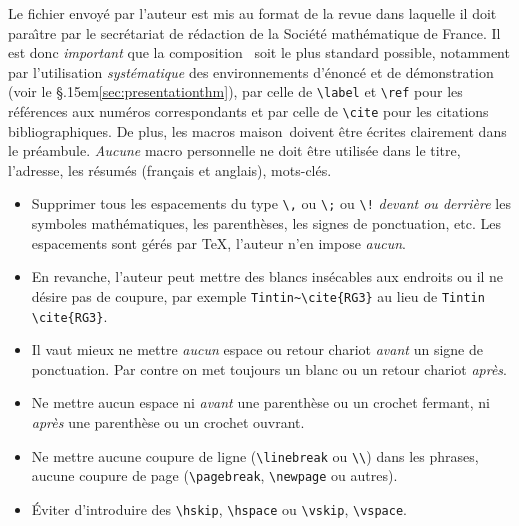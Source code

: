 \documentclass[11pt,francais]{smfart}
\newcommand{\SmF}{Soci\'et\'e ma\-th\'e\-ma\-ti\-que de France}
\newcommand{\T}{\S\kern .15em\relax }
\begin{document}
Le fichier envoy\'e par l'auteur est mis au format de la revue dans
laquelle il doit para\^\i tre par le secr\'etariat de r\'edaction de la
\SmF. Il est donc {\em important} que la composition \LaTeXe\ soit le plus
standard possible, notamment par l'utilisation {\em syst\'ematique} des
environnements d'\'enonc\'e et de d\'emonstration (voir le
\T\ref{sec:presentationthm}), par celle de \verb|\label| et
\verb|\ref| pour les r\'ef\'erences aux num\'eros correspondants et par celle de
\verb|\cite| pour les citations bibliographiques. De plus, les macros \og maison\fg\ doivent \^etre \'ecrites clairement dans le pr\'eambule. {\em Aucune} macro personnelle ne doit \^etre utilis\'ee dans le titre, l'adresse, les r\'esum\'es (fran\c cais et anglais), mots-cl\'es.


\begin{itemize}
\item
Supprimer tous les espacements du type \verb|\,| ou \verb|\;| ou \verb|\!|
{\em devant ou derri\`ere} les symboles math\'ematiques, les parenth\`eses,
les signes de ponctuation, etc. Les espacements sont g\'er\'es par \TeX,
l'auteur n'en impose \emph{aucun}.
\item
En revanche, l'auteur peut mettre des blancs ins\'ecables aux endroits ou il ne
d\'esire pas de coupure, par exemple
\verb|Tintin~\cite{RG3}| au lieu de \verb|Tintin \cite{RG3}|.

\item
Il vaut mieux ne mettre {\em aucun} espace ou retour chariot \emph{avant}
un signe de ponctuation. Par contre on met toujours un blanc ou un retour
chariot \emph{apr\`es}.

\item
Ne mettre aucun espace ni \emph{avant} une parenth\`ese ou un crochet fermant,
ni \emph{apr\`es} une parenth\`ese ou un crochet ouvrant.

\item
Ne mettre aucune coupure de ligne (\verb|\linebreak| ou \verb|\\|)
dans les phrases, aucune coupure de page
(\verb|\pagebreak|, \verb|\newpage| ou autres).

\item
\'Eviter d'introduire des \verb|\hskip|, \verb|\hspace|
ou \verb|\vskip|, \verb|\vspace|.
\end{itemize}


\end{document}
